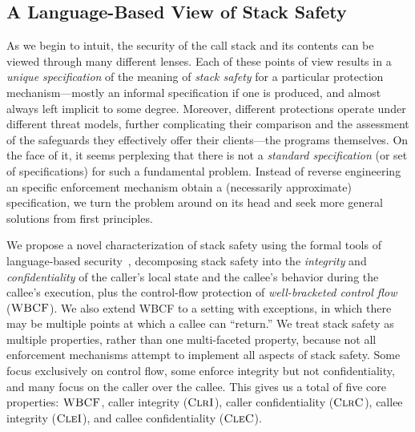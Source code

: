 \subsection{A Language-Based View of Stack Safety}

As we begin to intuit, the security of the call stack and its contents can be
viewed through many different lenses. Each of these points of view results in a
\emph{unique specification} of the meaning of \emph{stack safety} for a
particular protection mechanism---mostly an informal specification if one is
produced, and almost always left implicit to some degree.
%
Moreover, different protections operate under different threat models, further
complicating their comparison and the assessment of the safeguards they
effectively offer their clients---the programs themselves.
%
On the face of it, it seems perplexing that there is not a \emph{standard
specification} (or set of specifications) for such a fundamental problem.
Instead of reverse engineering an specific enforcement mechanism obtain a
(necessarily approximate) specification, we turn the problem around on its head
and seek more general solutions from first principles.
%

We propose a novel characterization of stack safety using the formal tools of language-based
security~\cite{sabelfeld2003language}, decomposing stack safety into
the {\em integrity} and {\em confidentiality} of the caller’s local state
and the callee's behavior during the callee's execution, plus the control-flow protection
of {\em well-bracketed control flow}~\cite{SkorstengaardSTKJFP} (\(\textnormal{\sc WBCF}\)).
\ifexceptions
We also extend WBCF to a setting with exceptions,
in which there may be multiple points at which a callee can ``return.''
\fi
%
We treat stack safety as multiple properties, rather than one multi-faceted property, because
not all enforcement mechanisms attempt to implement all aspects of stack safety. Some focus
exclusively on control flow, some enforce integrity but not confidentiality, and many
focus on the caller over the callee.
%
%
This gives us a total of five core properties: \(\textnormal{\sc WBCF}\),
caller integrity (\(\textnormal{\sc ClrI}\)), caller confidentiality (\(\textnormal{\sc ClrC}\)),
callee integrity (\(\textnormal{\sc CleI}\)), and callee confidentiality (\(\textnormal{\sc CleC}\)).
%

